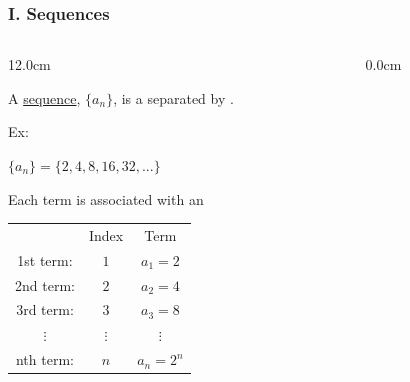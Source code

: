 \begin{frame}
\frametitle{I. Sequences}
\scriptsize
\begin{columns}
\begin{column}{12.0cm}

A \underline{sequence}, $\{a_n\}$, is a  separated by . \\

\vspace{0.2cm}

Ex: 
\begin{center}
	$\{a_n\} = \{2, 4,  8, 16, 32, ...\}$ \\
\end{center}
Each term is associated with an 
\begin{center}
	\setlength{\extrarowheight}{0.2cm}
	\begin{tabular}{ccc}
		& Index & Term \\
		1st term: & $1$ & $a_1 = 2$\\
		2nd term: & $2$ & $a_2 = 4$\\
		3rd term: &  $3$ & $a_3 = 8$\\
		$\vdots$ & $\vdots$ & $\vdots$ \\
		nth term: & $n$ & $a_n = 2^n$\\
	\end{tabular}
\end{center}

\vspace{0.2cm}

\end{column}
\begin{column}{0.0cm}\end{column}
\end{columns}
\end{frame}

